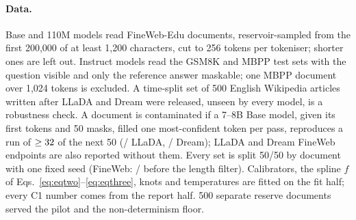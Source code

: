 \paragraph{Data.}
Base and 110M models read \VivaCorpusDocs{} FineWeb-Edu documents, reservoir-sampled
from the first 200,000 of at least 1,200 characters, cut to 256 tokens per tokeniser; shorter ones are left out. Instruct
models read the GSM8K \citep{cobbe2021gsm8k} and MBPP \citep{austin2021mbpp} test sets with the
question visible and only the reference answer maskable;
one MBPP document over 1,024 tokens is excluded. A time-split set of 500 English Wikipedia
articles written after LLaDA and Dream were released, unseen by every model, is a robustness check. A document is contaminated if a 7--8B Base model, given its first \VivaLladaContamPrefix{} tokens and 50 masks, filled one most-confident token per pass, reproduces a run of $\ge32$ of
the next 50 (\VivaLladaContamFlagged/\VivaLladaContamDocs{} LLaDA,
\VivaDreamContamFlagged/\VivaDreamContamDocs{} Dream); LLaDA and Dream FineWeb endpoints are also reported without them.
Every set is split 50/50 by document with one fixed seed (FineWeb: \VivaNFit{}/\VivaNReport{}
before the length filter). Calibrators, the spline $f$ of Eqs.~\ref{eq:eqtwo}--\ref{eq:eqthree}, knots and temperatures are fitted on the fit half; every C1 number comes from the report half.
500 separate reserve documents served the pilot and the non-determinism floor.

